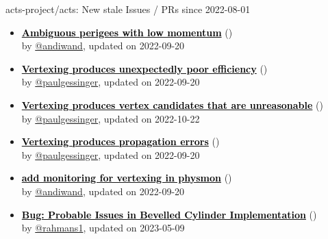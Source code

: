 \begin{frame}[allowframebreaks]{ acts-project/acts: New stale Issues / PRs since 2022-08-01 }
\begin{itemize}
    \item\iss\prstale\textbf{\href{https://github.com/acts-project/acts/issues/1386}{\textcolor{black}{Ambiguous perigees with low momentum}}}
    (\href{https://github.com/acts-project/acts/issues/1386}{}) \\
    by \href{https://github.com/andiwand}{@andiwand}, updated on 2022-09-20

    \item\iss\prstale\textbf{\href{https://github.com/acts-project/acts/issues/1362}{\textcolor{black}{Vertexing produces unexpectedly poor efficiency}}}
    (\href{https://github.com/acts-project/acts/issues/1362}{}) \\
    by \href{https://github.com/paulgessinger}{@paulgessinger}, updated on 2022-09-20

    \item\iss\prstale\textbf{\href{https://github.com/acts-project/acts/issues/1361}{\textcolor{black}{Vertexing produces vertex candidates that are unreasonable}}}
    (\href{https://github.com/acts-project/acts/issues/1361}{}) \\
    by \href{https://github.com/paulgessinger}{@paulgessinger}, updated on 2022-10-22

    \item\iss\prstale\textbf{\href{https://github.com/acts-project/acts/issues/1345}{\textcolor{black}{Vertexing produces propagation errors}}}
    (\href{https://github.com/acts-project/acts/issues/1345}{}) \\
    by \href{https://github.com/paulgessinger}{@paulgessinger}, updated on 2022-09-20

    \item\iss\prstale\textbf{\href{https://github.com/acts-project/acts/issues/1313}{\textcolor{black}{add monitoring for vertexing in physmon}}}
    (\href{https://github.com/acts-project/acts/issues/1313}{}) \\
    by \href{https://github.com/andiwand}{@andiwand}, updated on 2022-09-20

    \item\iss\prstale\textbf{\href{https://github.com/acts-project/acts/issues/1238}{\textcolor{black}{Bug: Probable Issues in Bevelled Cylinder Implementation}}}
    (\href{https://github.com/acts-project/acts/issues/1238}{}) \\
    by \href{https://github.com/rahmans1}{@rahmans1}, updated on 2023-05-09


\end{itemize}
\end{frame}
